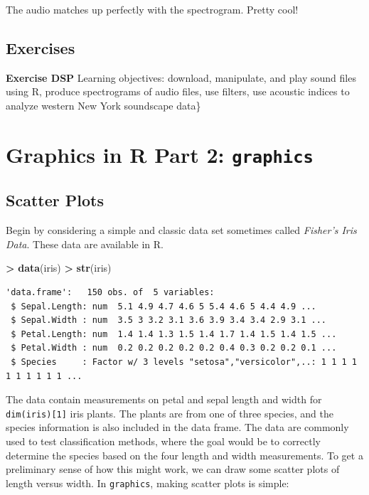 \documentclass[
]{krantz}
\makeatletter
\newenvironment{Shaded}{\begin{snugshade}}{\end{snugshade}}
\newcommand{\KeywordTok}[1]{\textcolor[rgb]{0.27,0.27,0.27}{\textbf{#1}}}
\newcommand{\NormalTok}[1]{#1}
\newcommand{\OperatorTok}[1]{\textcolor[rgb]{0.43,0.43,0.43}{\textbf{#1}}}
\newcommand{\StringTok}[1]{\textcolor[rgb]{0.5,0.5,0.5}{#1}}
\newenvironment{kframe}{%
\medskip{}
\setlength{\fboxsep}{.8em}
 \def\at@end@of@kframe{}%
 \ifinner\ifhmode%
  \def\at@end@of@kframe{\end{minipage}}%
  \begin{minipage}{\columnwidth}%
 \fi\fi%
 \def\FrameCommand##1{\hskip\@totalleftmargin \hskip-\fboxsep
 \colorbox{shadecolor}{##1}\hskip-\fboxsep
     \hskip-\linewidth \hskip-\@totalleftmargin \hskip\columnwidth}%
 \MakeFramed {\advance\hsize-\width
   \@totalleftmargin\z@ \linewidth\hsize
   \@setminipage}}%
 {\par\unskip\endMakeFramed%
 \at@end@of@kframe}
\renewenvironment{Shaded}{\begin{kframe}}{\end{kframe}}
\makeatother
\begin{document}
The audio matches up perfectly with the spectrogram. Pretty cool!

\hypertarget{exercises-11}{%
\section{Exercises}\label{exercises-11}}

\textbf{Exercise DSP} Learning objectives: download, manipulate, and play sound files using R, produce spectrograms of audio files, use filters, use acoustic indices to analyze western New York soundscape data\}

\hypertarget{graphics}{%
\chapter{\texorpdfstring{Graphics in R Part 2: \texttt{graphics}}{Graphics in R Part 2: graphics}}\label{graphics}}

\hypertarget{scatter-plots-1}{%
\section{Scatter Plots}\label{scatter-plots-1}}

Begin by considering a simple and classic data set sometimes called \emph{Fisher's Iris Data}. These data are available in R.

\begin{Shaded}
\begin{Highlighting}[]
\OperatorTok{\textgreater{}}\StringTok{ }\KeywordTok{data}\NormalTok{(iris)}
\OperatorTok{\textgreater{}}\StringTok{ }\KeywordTok{str}\NormalTok{(iris)}
\end{Highlighting}
\end{Shaded}

\begin{verbatim}
'data.frame':   150 obs. of  5 variables:
 $ Sepal.Length: num  5.1 4.9 4.7 4.6 5 5.4 4.6 5 4.4 4.9 ...
 $ Sepal.Width : num  3.5 3 3.2 3.1 3.6 3.9 3.4 3.4 2.9 3.1 ...
 $ Petal.Length: num  1.4 1.4 1.3 1.5 1.4 1.7 1.4 1.5 1.4 1.5 ...
 $ Petal.Width : num  0.2 0.2 0.2 0.2 0.2 0.4 0.3 0.2 0.2 0.1 ...
 $ Species     : Factor w/ 3 levels "setosa","versicolor",..: 1 1 1 1 1 1 1 1 1 1 ...
\end{verbatim}

The data contain measurements on petal and sepal length and width for \texttt{dim(iris){[}1{]}} iris plants. The plants are from one of three species, and the species information is also included in the data frame. The data are commonly used to test classification methods, where the goal would be to correctly determine the species based on the four length and width measurements. To get a preliminary sense of how this might work, we can draw some scatter plots of length versus width. In \texttt{graphics}, making scatter plots is simple:
\end{document}
